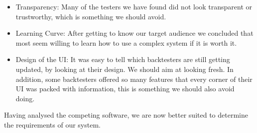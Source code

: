 \documentclass[main.tex]{subfiles}
\begin{document}
\begin{itemize}
    \item Transparency: Many of the testers we have found did not look transparent or trustworthy, which is something we should avoid.
    \item Learning Curve: After getting to know our target audience we concluded that most seem willing to learn how to use a complex system if it is worth it.
    \item Design of the UI: It was easy to tell which backtesters are still getting updated, by looking at their design. We should aim at looking fresh. In addition, some backtesters offered so many features that every corner of their UI was packed with information, this is something we should also avoid doing. 
\end{itemize}

Having analysed the competing software, we are now better suited to determine the requirements of our system. 
\end{document}
